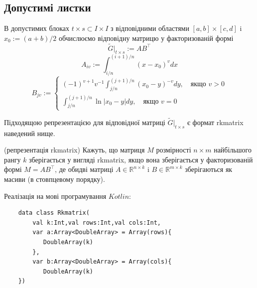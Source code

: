 \documentclass[12pt]{report}
\begin{document}
	\subsection{Допустимі листки}
	\hspace{0.8cm} В допустимих блоках $t\times s\subset I\times I$ з відповідними областями $[a,b]\times [c,d]$ i $x_0:=(a+b)/2$ обчислюємо відповідну матрицю у факторизованій формі
	$$\tilde{G}|_{t\times s}:=AB^\top$$
	$$A_{iv}:=\int_{i/n}^{(i+1)/n}(x-x_0)^vdx$$
	\begin{equation*}
		B_{jv}:=\begin{cases}
					(-1)^{v+1}v^{-1}\int_{j/n}^{(j+1)/n}(x_0-y)^{-v}dy,\quad\text{якщо $v>0$}\\
					\int_{j/n}^{(j+1)/n}\ln|x_0-y|dy,\quad\text{якщо $v=0$}
				\end{cases}
	\end{equation*}
	\par Підходящою репрезентацією для відповідної матриці $\tilde{G}|_{t\times s}$ є формат rkmatrix наведений нище.
	\begin{Def}
		(репрезентація rkmatrix)  Кажуть, що матриця $M$ розмірності $n\times m$ найбільшого рангу $k$ зберігається у вигляді rkmatrix, якщо вона зберігається у факторизованій формі $M=AB^\top$, де обидві матриці $A\in\mathbb{R}^{n\times k}$ i $B\in \mathbb{R}^{m\times k}$ зберігаються як масиви (в стовпцевому порядку).
	\end{Def}
	\par Реалізація на мові програмування $Kotlin$:
	\begin{verbatim}
	data class Rkmatrix(
	    val k:Int,val rows:Int,val cols:Int,
	    var a:Array<DoubleArray> = Array(rows){
	       DoubleArray(k)
	    },
	    var b:Array<DoubleArray> = Array(cols){
	       DoubleArray(k)
	})
	\end{verbatim}
\end{document}

